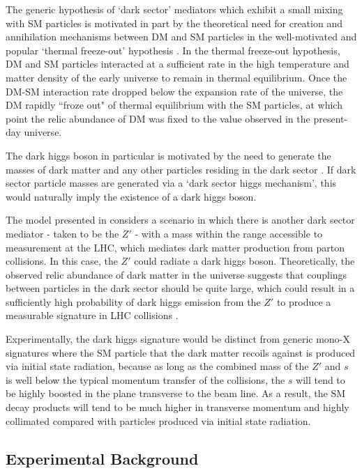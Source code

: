 \documentclass[12pt]{article}
\begin{document}
The generic hypothesis of `dark sector' mediators which exhibit a small mixing with SM particles is motivated in part by the theoretical need for creation and annihilation mechanisms between DM and SM particles in the well-motivated and popular `thermal freeze-out' hypothesis \cite{particle_dm}. In the thermal freeze-out hypothesis, DM and SM particles interacted at a sufficient rate in the high temperature and matter density of the early universe to remain in thermal equilibrium. Once the DM-SM interaction rate dropped below the expansion rate of the universe, the DM rapidly ``froze out" of thermal equilibrium with the SM particles, at which point the relic abundance of DM was fixed to the value observed in the present-day universe.

The dark higgs boson in particular is motivated by the need to generate the masses of dark matter and any other particles residing in the dark sector \cite{dark_higgs}. If dark sector particle masses are generated via a `dark sector higgs mechanism', this would naturally imply the existence of a dark higgs boson. 

The model presented in \cite{dark_higgs} considers a scenario in which there is another dark sector mediator - taken to be the $Z'$ - with a mass within the range accessible to measurement at the LHC, which mediates dark matter production from parton collisions. In this case, the $Z'$ could radiate a dark higgs boson. Theoretically, the observed relic abundance of dark matter in the universe suggests that couplings between particles in the dark sector should be quite large, which could result in a sufficiently high probability of dark higgs emission from the $Z'$ to produce a measurable signature in LHC collisions \cite{dark_higgs}. 

Experimentally, the dark higgs signature would be distinct from generic mono-X signatures where the SM particle that the dark matter recoils against is produced via initial state radiation, because as long as the combined mass of the $Z'$ and $s$ is well below the typical momentum transfer of the collisions, the $s$ will tend to be highly boosted in the plane transverse to the beam line. As a result, the SM decay products will tend to be much higher in transverse momentum and highly collimated compared with particles produced via initial state radiation.  

\subsection{Experimental Background}
\end{document}
